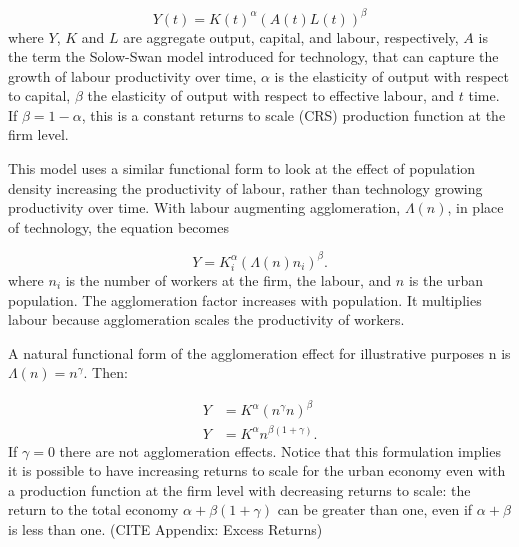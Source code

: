 \begin{equation} 
Y(t) = K(t)^{\alpha}(A(t)L(t))^{\beta}
\label{Eqn:Solow-Swann}
\end{equation}
where $Y$, $K$ and $L$ are aggregate output, capital, and labour, respectively,  $A$ is the term the Solow-Swan model introduced for technology, that can capture the growth of labour productivity over time, $\alpha$ is the elasticity of output with respect to capital, $\beta$ the elasticity of output with respect to effective labour, and $t$ time. If $\beta=1-\alpha$, this is a constant returns to scale (CRS) production function at the firm level.

 
This model uses a similar functional form to look at  the effect of population density increasing %
 the productivity of labour, rather than technology growing productivity over time. With labour augmenting agglomeration, $\Lambda(n)$, in place of technology, the equation becomes 

\begin{equation} 
Y=K_i^{\alpha }(\Lambda(n)n_i)^{\beta }.
\label{Eqn:Prod1}
\end{equation} 
where $n_i$ is the number of workers at the firm, the labour, and $n$ is the urban population. The agglomeration factor increases with population. It multiplies labour because agglomeration scales the productivity of workers. 

A natural functional form of the agglomeration effect for illustrative purposes n is $\Lambda(n) = n^\gamma$. Then:

\begin{eqnarray}
 Y&=K^{\alpha }(n^{\gamma}n)^{\beta}  \nonumber\\
 Y&=K^{\alpha }n^{\beta(1 + \gamma)}.
 \label{Eqn:Prod2}
\end{eqnarray}
If $\gamma=0$ there are not agglomeration effects. Notice that  this formulation implies it is possible to have increasing returns to scale for the urban economy even with a production function at the firm level with decreasing returns to scale: the return to the total economy $\alpha + \beta(1 + \gamma)$ can be greater than one, even if $\alpha +\beta$ is less than one. %
(CITE Appendix: Excess Returns)

